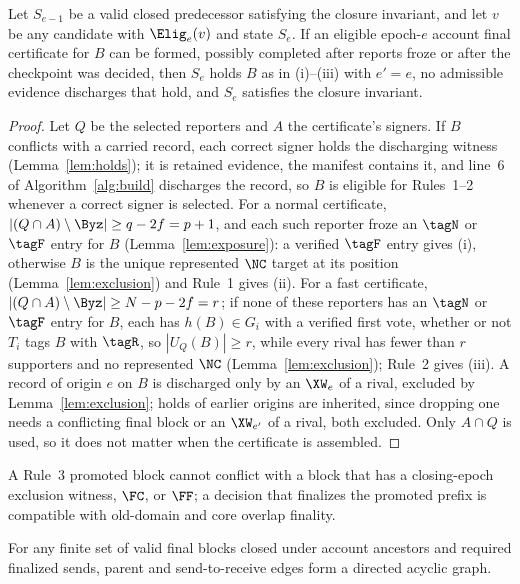 \begin{theorem}
\label{thm:closure}
Let $S_{e-1}$ be a valid closed predecessor satisfying the closure invariant, and let $v$ be any candidate with $\Elig_e(v)$ and state $S_e$. If an eligible epoch-$e$ account final certificate for $B$ can be formed, possibly completed after reports froze or after the checkpoint was decided, then $S_e$ holds $B$ as in (i)--(iii) with $e'=e$, no admissible evidence discharges that hold, and $S_e$ satisfies the closure invariant.
\end{theorem}
\begin{proof}
Let $Q$ be the selected reporters and $A$ the certificate's signers. If $B$ conflicts with a carried record, each correct signer holds the discharging witness (Lemma~\ref{lem:holds}); it is retained evidence, the manifest contains it, and line~6 of Algorithm~\ref{alg:build} discharges the record, so $B$ is eligible for Rules~1--2 whenever a correct signer is selected. For a normal certificate, $|(Q\cap A)\setminus\Byz|\ge q-2f=p+1$, and each such reporter froze an $\tagN$ or $\tagF$ entry for $B$ (Lemma~\ref{lem:exposure}): a verified $\tagF$ entry gives (i), otherwise $B$ is the unique represented $\NC$ target at its position (Lemma~\ref{lem:exclusion}) and Rule~1 gives (ii). For a fast certificate, $|(Q\cap A)\setminus\Byz|\ge N-p-2f=r$; if none of these reporters has an $\tagN$ or $\tagF$ entry for $B$, each has $h(B)\in G_i$ with a verified first vote, whether or not $T_i$ tags $B$ with $\tagR$, so $|U_Q(B)|\ge r$, while every rival has fewer than $r$ supporters and no represented $\NC$ (Lemma~\ref{lem:exclusion}); Rule~2 gives (iii). A record of origin $e$ on $B$ is discharged only by an $\XW_e$ of a rival, excluded by Lemma~\ref{lem:exclusion}; holds of earlier origins are inherited, since dropping one needs a conflicting final block or an $\XW_{e'}$ of a rival, both excluded. Only $A\cap Q$ is used, so it does not matter when the certificate is assembled.
\end{proof}

\begin{lemma}
\label{lem:promotion}
A Rule~3 promoted block cannot conflict with a block that has a closing-epoch exclusion witness, $\FC$, or $\FF$; a decision that finalizes the promoted prefix is compatible with old-domain and core overlap finality.
\end{lemma}

\begin{lemma}
\label{lem:dag}
For any finite set of valid final blocks closed under account ancestors and required finalized sends, parent and send-to-receive edges form a directed acyclic graph.
\end{lemma}

